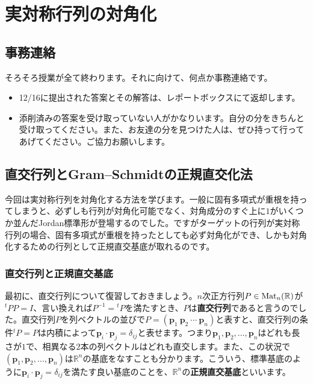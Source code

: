 \chapter{実対称行列の対角化}

\section{事務連絡}

そろそろ授業が全て終わります。それに向けて、何点か事務連絡です。
\begin{itemize}
\item 12/16に提出された答案とその解答は、レポートボックスにて返却します。
\item 添削済みの答案を受け取っていない人がかなりいます。自分の分をきちんと受け取ってください。また、お友達の分を見つけた人は、ぜひ持って行ってあげてください。ご協力お願いします。
\end{itemize}

\section{直交行列とGram--Schmidtの正規直交化法}

今回は実対称行列を対角化する方法を学びます。一般に固有多項式が重根を持ってしまうと、必ずしも行列が対角化可能でなく、対角成分のすぐ上に$1$がいくつか並んだJordan標準形が登場するのでした。ですがターゲットの行列が実対称行列の場合、固有多項式が重根を持ったとしても必ず対角化ができ、しかも対角化するための行列として正規直交基底が取れるのです。

\subsection{直交行列と正規直交基底}

最初に、直交行列について復習しておきましょう。$n$次正方行列$P \in \operatorname{Mat}_n(\mathbb{R})$が${}^t P P = I$、言い換えれば$P^{-1} = {}^tP$を満たすとき、$P$は\textbf{直交行列}であると言うのでした。直交行列$P$を列ベクトルの並びで$P = (\bm{p}_1 \ \bm{p}_2 \ \cdots \ \bm{p}_n)$と表すと、直交行列の条件${}^tP = P$は内積によって$\bm{p}_i \cdot \bm{p}_j = \delta_{ij}$と表せます。つまり$\bm{p}_1, \bm{p}_2, \ldots, \bm{p}_n$はどれも長さが$1$で、相異なる$2$本の列ベクトルはどれも直交します。また、この状況で$(\bm{p}_1, \bm{p}_2, \ldots, \bm{p}_n)$は$\mathbb{R}^n$の基底をなすことも分かります。こういう、標準基底のように$\bm{p}_i \cdot \bm{p}_j = \delta_{ij}$を満たす良い基底のことを、$\mathbb{R}^n$の\textbf{正規直交基底}といいます。


